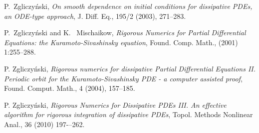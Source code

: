 \begin{thebibliography}{HNW00}
  P.\ Zgliczy\'nski, \emph{On smooth dependence on initial conditions for
dissipative  PDEs, an ODE-type approach}, J. Diff. Eq., 195/2 (2003), 271--283.



  P.\ Zgliczy\'nski and K. \ Mischaikow,
\emph{Rigorous Numerics for Partial Differential Equations: the
Kuramoto-Sivashinsky equation}, Found. Comp. Math., (2001) 1:255--288.



 P. Zgliczy\'nski,  \emph{Rigorous numerics for dissipative Partial Differential
   Equations II. Periodic orbit for the Kuramoto-Sivashinsky PDE - a computer assisted proof},
     Found. Comput. Math.,  4 (2004), 157--185.



 P. Zgliczy\'{n}ski, \emph{Rigorous Numerics for Dissipative PDEs III. An effective algorithm
for rigorous integration of dissipative PDEs}, Topol. Methods Nonlinear Anal., 36 (2010) 197-–262.

\end{thebibliography}


